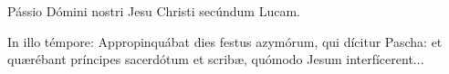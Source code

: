 
Pássio Dómini nostri Jesu Christi secúndum Lucam.

In illo témpore: Appropinquábat dies festus azymórum, qui dícitur Pascha: et quærébant príncipes sacerdótum et scribæ, quómodo Jesum interfícerent...
\par